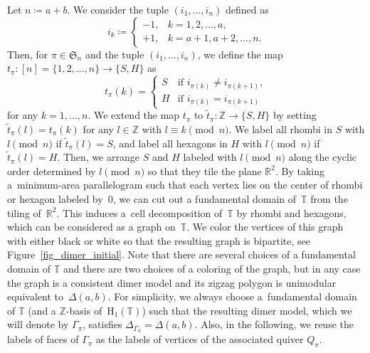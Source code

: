 \documentclass[pdftex]{sigma}
\numberwithin{equation}{section}
\theoremstyle{definition}
\newcommand{\ZZ}{\mathbb{Z}}
\newcommand{\RR}{\mathbb{R}}
\newcommand{\TT}{\mathbb{T}}
\newcommand{\rmH}{\mathrm{H}}
\newcommand{\fkS}{\mathfrak{S}}
\newcommand{\perm}{\pi}
\begin{document}
Let $n\coloneqq a+b$. We consider the tuple $(i_1, \dots, i_n)$ defined as
\begin{equation*}%
i_k\coloneqq\begin{cases}
-1,& k=1, 2, \dots, a, \\
+1,& k=a+1, a+2, \dots, n.
\end{cases}
\end{equation*}
Then, for $\perm\in\fkS_n$ and the tuple $(i_1, \dots, i_n)$, we define the map $t_\perm\colon [n]=\{1,2,\dots,n\}\rightarrow \{S, H\}$ as
\begin{equation}\label{eq_map_SH}
t_\perm(k)=
\begin{cases}
S & \text{if $i_{\perm(k)}\neq i_{\perm(k+1)}$},\\
H & \text{if $i_{\perm(k)}= i_{\perm(k+1)}$}
\end{cases}
\end{equation}
for any $k=1,\dots, n$.
We extend the map $t_\perm$ to $\widetilde{t}_\perm\colon \ZZ\rightarrow \{S, H\}$ by setting
$\widetilde{t}_\perm(l)=t_\perm(k)$ for any $l\in \ZZ$ with $l \equiv k \pmod n$.
We label all rhombi in $S$ with $l \pmod n$ if $\widetilde{t}_\perm(l)=S$,
and label all hexagons in $H$ with $l \pmod n$ if $\widetilde{t}_\perm(l)=H$.
Then, we arrange $S$ and $H$ labeled with $l \pmod n$ along the cyclic order determined by $l \pmod n$ so that they tile the plane $\RR^2$.
By taking a~minimum-area parallelogram such that each vertex lies on the center of rhombi or hexagon labeled by~$0$,
we can cut out a fundamental domain of~$\TT$ from the tiling of~$\RR^2$.
This induces a~cell decomposition of~$\TT$ by rhombi and hexagons, which can be considered as a graph on~$\TT$.
We color the vertices of this graph with either black or white so that the resulting graph is bipartite, see Figure~\ref{fig_dimer_initial}.
Note that there are several choices of a fundamental domain of $\TT$ and there are two choices of a coloring of the graph, but in any case
the graph is a consistent dimer model and its zigzag polygon is unimodular equivalent to~$\Delta(a,b)$.
For simplicity, we always choose a~fundamental domain of $\TT$ (and a $\ZZ$-basis of~$\rmH_1(\TT)$)
such that the resulting dimer model, which we will denote by $\Gamma_\perm$, satisfies $\Delta_{\Gamma_\perm}=\Delta(a,b)$.
Also, in the following, we reuse the labels of faces of $\Gamma_\perm$ as the labels of vertices of the associated quiver $Q_\perm$.
\end{document}
